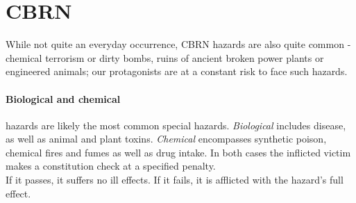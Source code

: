 \documentclass[11pt,a4paper,openany,dvipsnames]{book}
\begin{document}
	\section{CBRN}
	\label{hazards:cbrn}
	While not quite an everyday occurrence, CBRN hazards are also quite common - chemical terrorism or dirty bombs, ruins of ancient broken power plants or engineered animals; our protagonists are at a constant risk to face such hazards.
	\paragraph{Biological and chemical} hazards are likely the most common special hazards. \emph{Biological} includes disease, as well as animal and plant toxins. \emph{Chemical} encompasses synthetic poison, chemical fires and fumes as well as drug intake. In both cases the inflicted victim makes a constitution check at a specified penalty.\\
	If it passes, it suffers no ill effects. If it fails, it is afflicted with the hazard’s full effect.
\end{document}
